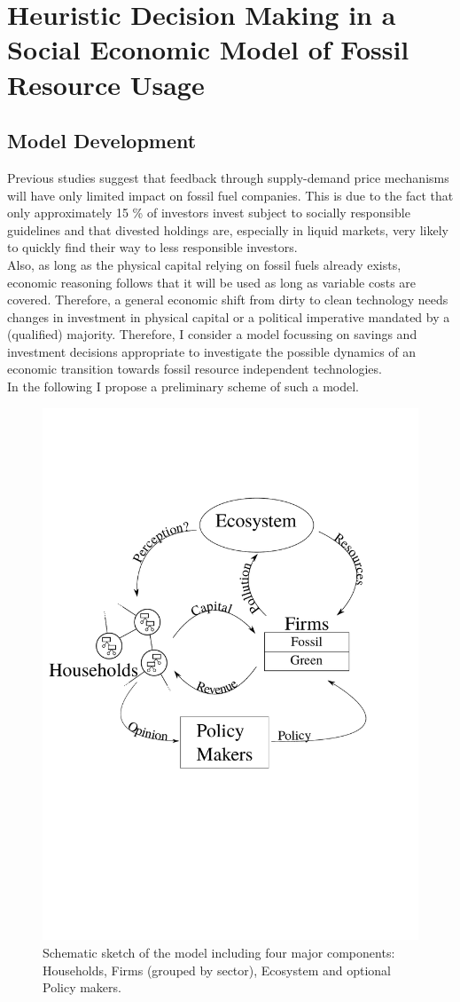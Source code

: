 \chapter{Heuristic Decision Making in a Social Economic Model of Fossil Resource Usage}
\section{Model Development} 
\label{sec:heuristics_model}
Previous studies \cite{Ans2013} suggest that feedback through supply-demand price mechanisms will have only limited impact on fossil fuel companies. This is due to the fact that only approximately 15 \% of investors invest subject to socially responsible guidelines \cite{SIF2014Report} and that divested holdings are, especially in liquid markets, very likely to quickly find their way to less responsible investors. \\
Also, as long as the physical capital relying on fossil fuels already exists, economic reasoning follows that it will be used as long as variable costs are covered.
Therefore, a general economic shift from dirty to clean technology needs changes in investment in physical capital or a political imperative mandated by a (qualified) majority. Therefore, I consider a model focussing on savings and investment decisions appropriate to investigate the possible dynamics of an economic transition towards fossil resource independent technologies.\\
In the following I propose a preliminary scheme of such a model.

\begin{figure}[t]
	\centering
	\includegraphics[width =.7 \textwidth]{figures/Model_Scheme.pdf}
	\caption{Schematic sketch of the model including four major components: Households, Firms (grouped by sector), Ecosystem and optional Policy makers.}
	\label{fig:model}
\end{figure}

